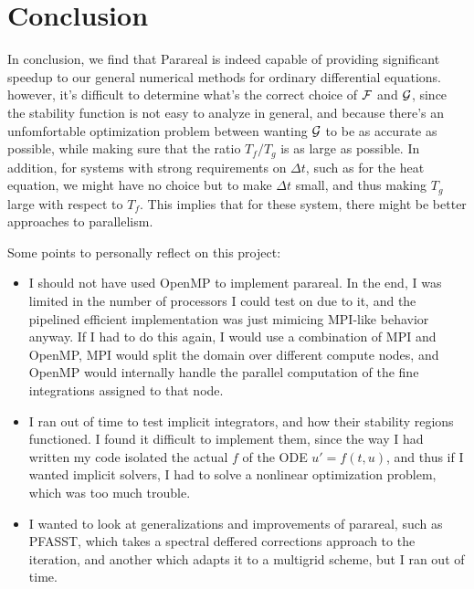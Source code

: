 \section{Conclusion}

In conclusion, we find that Parareal is indeed capable of providing significant
speedup to our general numerical methods for ordinary differential equations.
however, it's difficult to determine what's the correct choice of $\mathcal{F}$ and
$\mathcal{G}$, since the stability function is not easy to analyze in general, and
because there's an unfomfortable optimization problem between wanting $\mathcal{G}$
to be as accurate as possible, while making sure that the ratio $T_f/T_g$ is as
large as possible. In addition, for systems with strong requirements on $\Delta
t$, such as for the heat equation, we might have no choice but to make $\Delta
t$ small, and thus making $T_g$ large with respect to $T_f$. This implies that
for these system, there might be better approaches to parallelism.

Some points to personally reflect on this project:
\begin{itemize}
  \item I should not have used OpenMP to implement parareal. In the end, I was
    limited in the number of processors I could test on due to it, and the
    pipelined efficient implementation was just mimicing MPI-like behavior
    anyway. If I had to do this again, I would use a combination of MPI and
    OpenMP, MPI would split the domain over different compute nodes, and OpenMP
    would internally handle the parallel computation of the fine integrations
    assigned to that node.
\item I ran out of time to test implicit integrators, and how their stability
  regions functioned. I found it difficult to implement them, since the way I
  had written my code isolated the actual $f$ of the ODE $u' = f(t,u)$, and
  thus if I wanted implicit solvers, I had to solve a nonlinear optimization
  problem, which was too much trouble.
\item I wanted to look at generalizations and improvements of parareal, such as
  PFASST, which takes a spectral deffered corrections approach to the iteration,
  and another which adapts it to a multigrid scheme, but I ran out of time.
\end{itemize}
